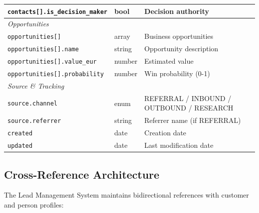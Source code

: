 \begin{table}[htbp]
\begin{tabular}{@{}p{3.5cm}p{2cm}p{6cm}@{}}
\texttt{contacts[].is\_decision\_maker} & bool & Decision authority \\
\midrule
\multicolumn{3}{l}{\textit{Opportunities}} \\
\texttt{opportunities[]} & array & Business opportunities \\
\texttt{opportunities[].name} & string & Opportunity description \\
\texttt{opportunities[].value\_eur} & number & Estimated value \\
\texttt{opportunities[].probability} & number & Win probability (0-1) \\
\midrule
\multicolumn{3}{l}{\textit{Source \& Tracking}} \\
\texttt{source.channel} & enum & REFERRAL / INBOUND / OUTBOUND / RESEARCH \\
\texttt{source.referrer} & string & Referrer name (if REFERRAL) \\
\texttt{created} & date & Creation date \\
\texttt{updated} & date & Last modification date \\
\bottomrule
\end{tabular}
\end{table}

\subsection{Cross-Reference Architecture}

The Lead Management System maintains bidirectional references with customer and person profiles:


